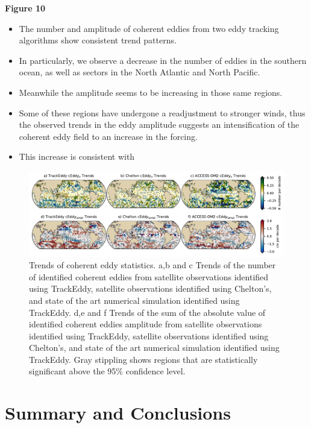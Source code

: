 \documentclass[draft,linenumbers]{agujournal2019}
\begin{document}
	\textbf{Figure 10}
	\begin{itemize}
		\item The number and amplitude of coherent eddies from two eddy tracking algorithms show consistent trend patterns. 
		\item In particularly, we observe a decrease in the number of eddies in the southern ocean, as well as sectors in the North Atlantic and North Pacific. 
		\item Meanwhile the amplitude seems to be increasing in those same regions. 
		\item Some of these regions have undergone a readjustment to stronger winds, thus the observed trends in the eddy amplitude suggests an intensification of the coherent eddy field to an increase in the forcing.
		\item This increase is consistent with \citet{Martinez_Kinetic_2021}
	\end{itemize}

	\begin{figure}
	    \centering
	    \includegraphics[width=1\textwidth]{figures/all_trackeddy_trends.pdf}
	    \caption{Trends of coherent eddy statistics. a,b and c Trends of the number of identified coherent eddies from satellite observations identified using TrackEddy, satellite observations identified using Chelton's, and state of the art numerical simulation identified using TrackEddy. d,e and f Trends of the sum of the absolute value of identified coherent eddies amplitude from satellite observations identified using TrackEddy, satellite observations identified using Chelton's, and state of the art numerical simulation identified using TrackEddy. Gray stippling shows regions that are statistically significant above the 95\% confidence level.
		}
	    \label{fig:eddy_stats_trends}
	\end{figure}
	
	\section{Summary and Conclusions}	
	
	\acknowledgments
	
	
	
\end{document}

